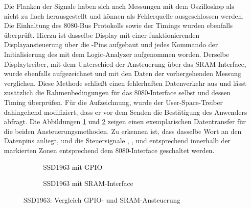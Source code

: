 Die Flanken der Signale haben sich nach Messungen mit dem Oszilloskop als nicht zu flach herausgestellt und können als Fehlerquelle ausgeschlossen werden. Die Einhaltung des 8080-Bus Protokolls sowie der Timings wurden ebenfalls überprüft. Hierzu ist dasselbe Display mit einer funktionierenden Displayansteuerung über die -Pins aufgebaut und jedes Kommando der Initialisierung des  mit dem Logic-Analyzer aufgenommen worden. Derselbe Displaytreiber, mit dem Unterschied der Ansteuerung über das SRAM-Interface, wurde ebenfalls aufgezeichnet und mit den Daten der vorhergehenden Messung verglichen. Diese Methode schließt einen fehlerhaften Datenverkehr aus und lässt zusätzlich die Rahmenbedingungen für das 8080-Interface selbst und dessen Timing überprüfen. Für die Aufzeichnung, wurde der User-Space-Treiber dahingehend modifiziert, dass er vor dem Senden die Bestätigung des Anwenders abfragt. Die Abbildungen \ref{fig:ssd1963_gpio} und \ref{fig:ssd1963_sram} zeigen einen exemplarischen Datentransfer für die beiden Ansteuerungsmethoden. Zu erkennen ist, dass dasselbe Wort an den Datenpins  anliegt, und die Steuersignale , ,  und  entsprechend innerhalb der markierten Zonen entsprechend dem 8080-Interface geschaltet werden. 

\begin{figure}[htp]
        \begin{center}
        \begin{subfigure}[htp]{1\textwidth}
			\centering
	\caption{SSD1963 mit GPIO}
			\label{fig:ssd1963_gpio}
		\end{subfigure}


        \begin{subfigure}[htp]{1\textwidth}
	\centering
{}
	\caption{SSD1963 mit SRAM-Interface}
	\label{fig:ssd1963_sram}
\end{subfigure}

		\end{center}
\caption{SSD1963: Vergleich GPIO- und SRAM-Ansteuerung}
	\label{fig:ssd1963_gpio_sram}
\end{figure}

